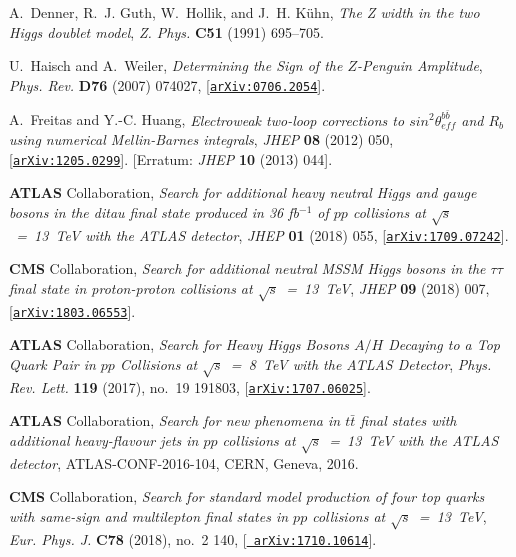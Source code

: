 \documentclass[review]{elsarticle}
\begin{document}
\begin{thebibliography}{100}
A.~Denner, R.~J. Guth, W.~Hollik, and J.~H. K{\"u}hn, {\it {The Z width in the
  two Higgs doublet model}},  {\em Z. Phys.} {\bf C51} (1991) 695--705.

U.~Haisch and A.~Weiler, {\it {Determining the Sign of the $Z$-Penguin
  Amplitude}},  {\em Phys. Rev.} {\bf D76} (2007) 074027,
  [\href{http://arxiv.org/abs/0706.2054}{{\tt arXiv:0706.2054}}].

A.~Freitas and Y.-C. Huang, {\it {Electroweak two-loop corrections to $sin^{2}
  \theta^{b \bar b}_{eff}$ and $R_{b}$ using numerical Mellin-Barnes
  integrals}},  {\em JHEP} {\bf 08} (2012) 050,
  [\href{http://arxiv.org/abs/1205.0299}{{\tt arXiv:1205.0299}}]. [Erratum:
  {\it JHEP} {\bf 10} (2013) 044].

{\bf ATLAS} Collaboration, {\it {Search for additional heavy
  neutral Higgs and gauge bosons in the ditau final state produced in 36
  fb$^{-1}$ of $pp$ collisions at $ \sqrt{s}$~=~13~TeV with the ATLAS
  detector}},  {\em JHEP} {\bf 01} (2018) 055,
  [\href{http://arxiv.org/abs/1709.07242}{{\tt arXiv:1709.07242}}].
  
{\bf CMS} Collaboration, {\it {Search for additional
  neutral MSSM Higgs bosons in the $\tau\tau$ final state in proton-proton
  collisions at $\sqrt{s}$~=~13~TeV}},  {\em JHEP} {\bf 09} (2018) 007,
  [\href{http://arxiv.org/abs/1803.06553}{{\tt arXiv:1803.06553}}].

{\bf ATLAS} Collaboration, {\it {Search for Heavy Higgs
  Bosons $A/H$ Decaying to a Top Quark Pair in $pp$ Collisions at
  $\sqrt{s}$~=~8~TeV with the ATLAS Detector}},  {\em
  Phys. Rev. Lett.} {\bf 119} (2017), no.~19 191803,
  [\href{http://arxiv.org/abs/1707.06025}{{\tt arXiv:1707.06025}}].
  
{\bf ATLAS} Collaboration, {\it {Search for new phenomena in $t\bar{t}$ final
  states with additional heavy-flavour jets in $pp$ collisions at $\sqrt{s}$~=~13~TeV with the ATLAS detector}},  
  ATLAS-CONF-2016-104, CERN, Geneva, 2016.  

{\bf CMS} Collaboration, {\it {Search for standard model
  production of four top quarks with same-sign and multilepton final states in
  $pp$ collisions at $\sqrt{s}$~=~13~TeV}},  {\em Eur. Phys. J.} {\bf
  C78} (2018), no.~2 140, [\href{http://arxiv.org/abs/1710.10614}{{\tt
  arXiv:1710.10614}}].


\end{thebibliography}
\end{document}
